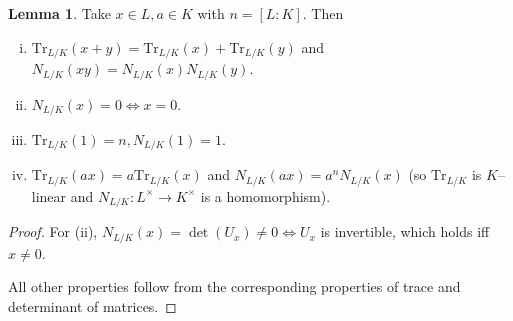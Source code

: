 \documentclass{article}
\theoremstyle{definition}
\newtheorem{lemma}[theorem]{Lemma}
\begin{document}
\begin{lemma}\label{13.1}
    Take $x \in L, a \in K$ with $n = [L:K]$. Then
    \begin{enumerate}[(i)]
        \item $\text{Tr}_{L/K}(x+y) = \text{Tr}_{L/K}(x) + \text{Tr}_{L/K}(y)$ and $N_{L/K}(xy) = N_{L/K}(x) N_{L/K}(y)$.
        \item $N_{L/K}(x)=0 \iff x=0$.
        \item $\text{Tr}_{L/K}(1)=n, N_{L/K}(1)=1$.
        \item $\text{Tr}_{L/K}(ax)=a \text{Tr}_{L/K}(x)$ and $N_{L/K}(ax)=a^n N_{L/K}(x)$ (so $\text{Tr}_{L/K}$ is $K$--linear and $N_{L/K}: L^\times \to K^\times$ is a homomorphism).
    \end{enumerate}
\end{lemma}
\begin{proof}    
    For (ii), $N_{L/K}(x) = \det(U_x) \neq 0 \iff U_x$ is invertible, which holds iff $x\neq0$.
    \vspace{1mm}
    
    All other properties follow from the corresponding properties of trace and determinant of matrices.
\end{proof}

\end{document}
